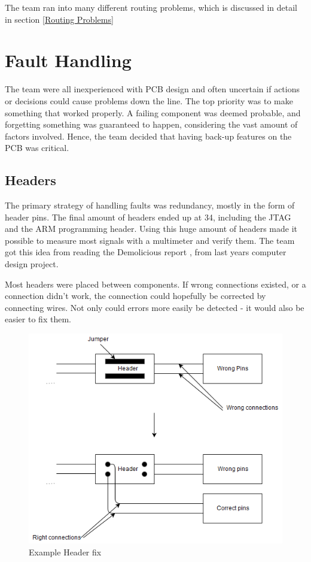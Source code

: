 The team ran into many different routing problems, which is discussed in detail in section \ref{Routing Problems}

\section{Fault Handling}
The team were all inexperienced with PCB design and often uncertain if actions or decisions could cause problems down the line. 
The top priority was to make something that worked properly. 
A failing component was deemed probable, and forgetting something was guaranteed to happen, considering the vast amount of factors involved. 
Hence, the team decided that having back-up features on the PCB was critical.

\subsection{Headers}
The primary strategy of handling faults was redundancy, mostly in the form of header pins. 
The final amount of headers ended up at 34, including the JTAG and the ARM programming header. 
Using this huge amount of headers made it possible to measure most signals with a multimeter and verify them. 
The team got this idea from reading the Demolicious report \cite{demolicious-report}, from last years computer design project. 

Most headers were placed between components. 
If wrong connections existed, or a connection didn't work, the connection could hopefully be corrected by connecting wires. 
Not only could errors more easily be detected - it would also be easier to fix them.

\begin{figure}[h!]
\centering
\includegraphics[scale = 0.45]{images/Header_fix.png}
\caption{Example Header fix}
\label{fig:Header fix}
\end{figure}

